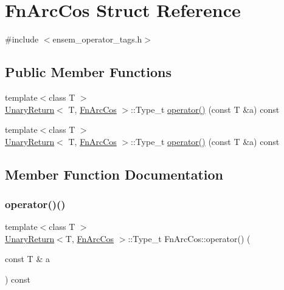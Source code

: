 \hypertarget{structFnArcCos}{}\section{Fn\+Arc\+Cos Struct Reference}
\label{structFnArcCos}


{\ttfamily \#include $<$ensem\+\_\+operator\+\_\+tags.\+h$>$}

\subsection*{Public Member Functions}
\begin{DoxyCompactItemize}
\item 
{\footnotesize template$<$class T $>$ }\\\mbox{\hyperlink{structUnaryReturn}{Unary\+Return}}$<$ T, \mbox{\hyperlink{structFnArcCos}{Fn\+Arc\+Cos}} $>$\+::Type\+\_\+t \mbox{\hyperlink{structFnArcCos_a1485eed840820589bafab9b8cc21c43d}{operator()}} (const T \&a) const
\item 
{\footnotesize template$<$class T $>$ }\\\mbox{\hyperlink{structUnaryReturn}{Unary\+Return}}$<$ T, \mbox{\hyperlink{structFnArcCos}{Fn\+Arc\+Cos}} $>$\+::Type\+\_\+t \mbox{\hyperlink{structFnArcCos_a1485eed840820589bafab9b8cc21c43d}{operator()}} (const T \&a) const
\end{DoxyCompactItemize}


\subsection{Member Function Documentation}
\mbox{\label{structFnArcCos_a1485eed840820589bafab9b8cc21c43d}} 
\subsubsection{\texorpdfstring{operator()()}{operator()()}\hspace{0.1cm}{\footnotesize\ttfamily [1/2]}}
{\footnotesize\ttfamily template$<$class T $>$ \\
\mbox{\hyperlink{structUnaryReturn}{Unary\+Return}}$<$T, \mbox{\hyperlink{structFnArcCos}{Fn\+Arc\+Cos}} $>$\+::Type\+\_\+t Fn\+Arc\+Cos\+::operator() (\begin{DoxyParamCaption}\item[{const T \&}]{a }\end{DoxyParamCaption}) const\hspace{0.3cm}{\ttfamily [inline]}}

